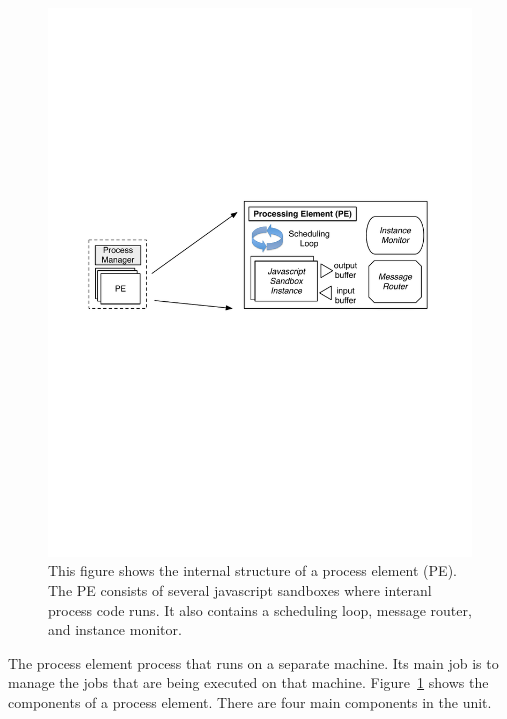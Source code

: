 \begin{figure}[th!] %
\centering
\includegraphics[width=0.85\columnwidth]{figs/pe_internals}
\caption{This figure shows the internal structure of a process element (PE).  The PE consists of several
javascript sandboxes where interanl process code runs.  It also contains a scheduling loop, message router, and instance 
monitor.}
\label{fig:pe_internals}
\end{figure}


The process element process that runs on a separate machine.  Its main job is to manage the jobs that are being executed on that
machine.  Figure~\ref{fig:pe_internals} shows the components of a process element.  There are four main components in the unit.


